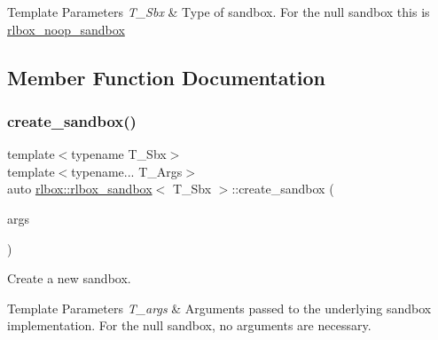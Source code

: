 \begin{DoxyTemplParams}{Template Parameters}
{\em T\+\_\+\+Sbx} & Type of sandbox. For the null sandbox this is {\ttfamily \hyperlink{classrlbox_1_1rlbox__noop__sandbox}{rlbox\+\_\+noop\+\_\+sandbox}} \\
\hline
\end{DoxyTemplParams}


\subsection{Member Function Documentation}
\mbox{\label{classrlbox_1_1rlbox__sandbox_a7b938866462f607bcc069770c1bc1ba6}} 
\subsubsection{\texorpdfstring{create\+\_\+sandbox()}{create\_sandbox()}}
{\footnotesize\ttfamily template$<$typename T\+\_\+\+Sbx$>$ \\
template$<$typename... T\+\_\+\+Args$>$ \\
auto \hyperlink{classrlbox_1_1rlbox__sandbox}{rlbox\+::rlbox\+\_\+sandbox}$<$ T\+\_\+\+Sbx $>$\+::create\+\_\+sandbox (\begin{DoxyParamCaption}\item[{T\+\_\+\+Args...}]{args }\end{DoxyParamCaption})\hspace{0.3cm}{\ttfamily [inline]}}



Create a new sandbox. 


\begin{DoxyTemplParams}{Template Parameters}
{\em T\+\_\+args} & Arguments passed to the underlying sandbox implementation. For the null sandbox, no arguments are necessary. \\
\hline
\end{DoxyTemplParams}
\mbox{\label{classrlbox_1_1rlbox__sandbox_a775b1828f996dc8f14f24a296096e0e3}} 
